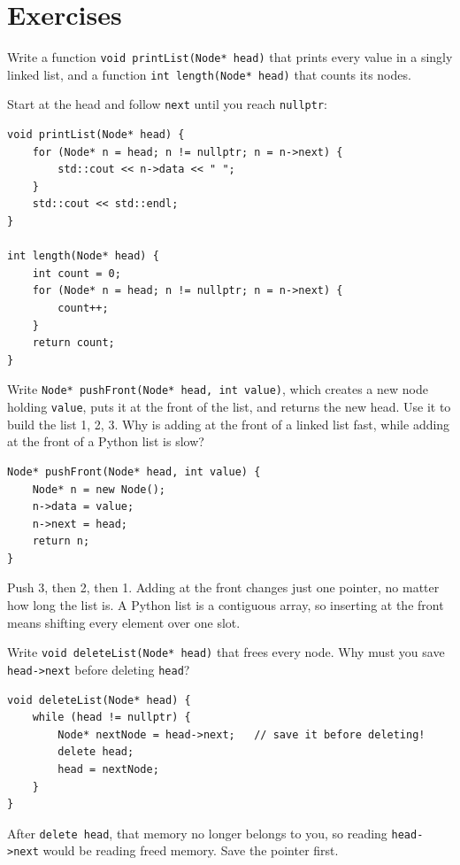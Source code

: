\section{Exercises}

\begin{Exercise}[title={Walking the List}, label=ll_print]
Write a function \texttt{void printList(Node* head)} that prints every value
in a singly linked list, and a function \texttt{int length(Node* head)} that
counts its nodes.
\end{Exercise}
\begin{Answer}[ref=ll_print]
Start at the head and follow \texttt{next} until you reach \texttt{nullptr}:
\begin{verbatim}
void printList(Node* head) {
    for (Node* n = head; n != nullptr; n = n->next) {
        std::cout << n->data << " ";
    }
    std::cout << std::endl;
}

int length(Node* head) {
    int count = 0;
    for (Node* n = head; n != nullptr; n = n->next) {
        count++;
    }
    return count;
}
\end{verbatim}
\end{Answer}

\begin{Exercise}[title={Adding to the Front}, label=ll_push]
Write \texttt{Node* pushFront(Node* head, int value)}, which creates a new
node holding \texttt{value}, puts it at the front of the list, and returns
the new head. Use it to build the list 1, 2, 3. Why is adding at the front
of a linked list fast, while adding at the front of a Python list is slow?
\end{Exercise}
\begin{Answer}[ref=ll_push]
\begin{verbatim}
Node* pushFront(Node* head, int value) {
    Node* n = new Node();
    n->data = value;
    n->next = head;
    return n;
}
\end{verbatim}
Push 3, then 2, then 1. Adding at the front changes just one pointer, no
matter how long the list is. A Python list is a contiguous array, so
inserting at the front means shifting every element over one slot.
\end{Answer}

\begin{Exercise}[title={Cleaning Up}, label=ll_delete]
Write \texttt{void deleteList(Node* head)} that frees every node. Why must
you save \texttt{head->next} before deleting \texttt{head}?
\end{Exercise}
\begin{Answer}[ref=ll_delete]
\begin{verbatim}
void deleteList(Node* head) {
    while (head != nullptr) {
        Node* nextNode = head->next;   // save it before deleting!
        delete head;
        head = nextNode;
    }
}
\end{verbatim}
After \texttt{delete head}, that memory no longer belongs to you, so reading
\texttt{head->next} would be reading freed memory. Save the pointer first.
\end{Answer}
